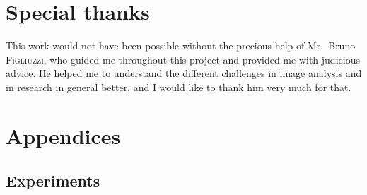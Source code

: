 \documentclass{article}
\begin{document}
\newpage
\section*{Special thanks}
This work would not have been possible without the precious help of Mr.~Bruno \textsc{Figliuzzi}, who guided me throughout this project and provided me with judicious advice. He helped me to understand the different challenges in image analysis and in research in general better, and I would like to thank him very much for that.




\newpage
\section*{Appendices}

    \subsection*{Experiments}
    \cite{todo-experiments}
\end{document}

